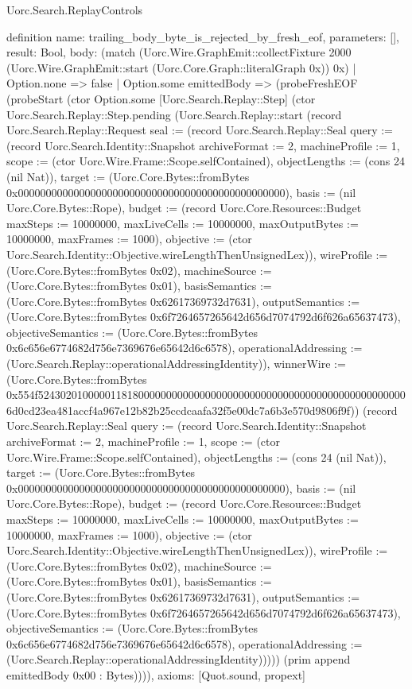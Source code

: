 \begin{lexlean}{Uorc.Search.ReplayControls}
\begin{semanticmodule}
definition{
  name: trailing_body_byte_is_rejected_by_fresh_eof,
  parameters: [],
  result: Bool,
  body: (match (Uorc.Wire.GraphEmit::collectFixture 2000 (Uorc.Wire.GraphEmit::start (Uorc.Core.Graph::literalGraph 0x)) 0x)
    | Option.none => false
    | Option.some emittedBody => (probeFreshEOF (probeStart (ctor Option.some [Uorc.Search.Replay::Step] (ctor Uorc.Search.Replay::Step.pending (Uorc.Search.Replay::start (record Uorc.Search.Replay::Request {seal := (record Uorc.Search.Replay::Seal {query := (record Uorc.Search.Identity::Snapshot {archiveFormat := 2, machineProfile := 1, scope := (ctor Uorc.Wire.Frame::Scope.selfContained), objectLengths := (cons 24 (nil Nat)), target := (Uorc.Core.Bytes::fromBytes 0x000000000000000000000000000000000000000000000000), basis := (nil Uorc.Core.Bytes::Rope), budget := (record Uorc.Core.Resources::Budget {maxSteps := 10000000, maxLiveCells := 10000000, maxOutputBytes := 10000000, maxFrames := 1000}), objective := (ctor Uorc.Search.Identity::Objective.wireLengthThenUnsignedLex)}), wireProfile := (Uorc.Core.Bytes::fromBytes 0x02), machineSource := (Uorc.Core.Bytes::fromBytes 0x01), basisSemantics := (Uorc.Core.Bytes::fromBytes 0x62617369732d7631), outputSemantics := (Uorc.Core.Bytes::fromBytes 0x6f7264657265642d656d7074792d6f626a65637473), objectiveSemantics := (Uorc.Core.Bytes::fromBytes 0x6c656e6774682d756e7369676e65642d6c6578), operationalAddressing := (Uorc.Search.Replay::operationalAddressingIdentity)}), winnerWire := (Uorc.Core.Bytes::fromBytes 0x554f5243020100000118180000000000000000000000000000000000000000000000006d0cd23ea481accf4a967e12b82b25ccdcaafa32f5e00dc7a6b3e570d9806f9f)}) (record Uorc.Search.Replay::Seal {query := (record Uorc.Search.Identity::Snapshot {archiveFormat := 2, machineProfile := 1, scope := (ctor Uorc.Wire.Frame::Scope.selfContained), objectLengths := (cons 24 (nil Nat)), target := (Uorc.Core.Bytes::fromBytes 0x000000000000000000000000000000000000000000000000), basis := (nil Uorc.Core.Bytes::Rope), budget := (record Uorc.Core.Resources::Budget {maxSteps := 10000000, maxLiveCells := 10000000, maxOutputBytes := 10000000, maxFrames := 1000}), objective := (ctor Uorc.Search.Identity::Objective.wireLengthThenUnsignedLex)}), wireProfile := (Uorc.Core.Bytes::fromBytes 0x02), machineSource := (Uorc.Core.Bytes::fromBytes 0x01), basisSemantics := (Uorc.Core.Bytes::fromBytes 0x62617369732d7631), outputSemantics := (Uorc.Core.Bytes::fromBytes 0x6f7264657265642d656d7074792d6f626a65637473), objectiveSemantics := (Uorc.Core.Bytes::fromBytes 0x6c656e6774682d756e7369676e65642d6c6578), operationalAddressing := (Uorc.Search.Replay::operationalAddressingIdentity)})))) (prim append emittedBody 0x00 : Bytes)))),
  axioms: [Quot.sound, propext]
}


\end{semanticmodule}
\end{lexlean}
